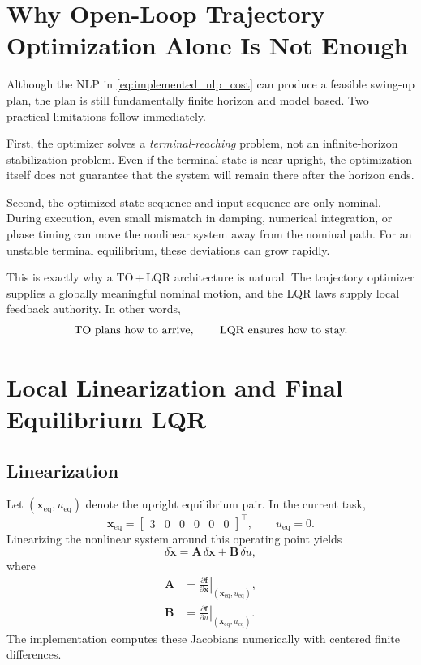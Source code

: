 \documentclass[conference]{IEEEtran}
\begin{document}
\section{Why Open-Loop Trajectory Optimization Alone Is Not Enough}
Although the NLP in \eqref{eq:implemented_nlp_cost} can produce a feasible swing-up plan, the plan is still fundamentally finite horizon and model based. Two practical limitations follow immediately.

First, the optimizer solves a \emph{terminal-reaching} problem, not an infinite-horizon stabilization problem. Even if the terminal state is near upright, the optimization itself does not guarantee that the system will remain there after the horizon ends.

Second, the optimized state sequence and input sequence are only nominal. During execution, even small mismatch in damping, numerical integration, or phase timing can move the nonlinear system away from the nominal path. For an unstable terminal equilibrium, these deviations can grow rapidly.

This is exactly why a TO\,+\,LQR architecture is natural. The trajectory optimizer supplies a globally meaningful nominal motion, and the LQR laws supply local feedback authority. In other words,
\begin{equation}
\text{TO plans how to arrive, \qquad LQR ensures how to stay.}
\end{equation}

\section{Local Linearization and Final Equilibrium LQR}
\subsection{Linearization}
Let $(\bm{x}_{\mathrm{eq}},u_{\mathrm{eq}})$ denote the upright equilibrium pair. In the current task,
\begin{equation}
\bm{x}_{\mathrm{eq}} =
\begin{bmatrix}
3 & 0 & 0 & 0 & 0 & 0
\end{bmatrix}^{\top},
\qquad
u_{\mathrm{eq}} = 0.
\end{equation}
Linearizing the nonlinear system around this operating point yields
\begin{equation}
\delta \dot{\bm{x}} = \bm{A}\,\delta\bm{x} + \bm{B}\,\delta u,
\label{eq:linearized_eq}
\end{equation}
where
\begin{align}
\bm{A} &= \left.\frac{\partial \bm{f}}{\partial \bm{x}}\right|_{(\bm{x}_{\mathrm{eq}},u_{\mathrm{eq}})}, \\
\bm{B} &= \left.\frac{\partial \bm{f}}{\partial u}\right|_{(\bm{x}_{\mathrm{eq}},u_{\mathrm{eq}})}.
\end{align}
The implementation computes these Jacobians numerically with centered finite differences.
\end{document}

